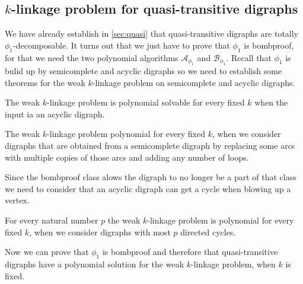 \subsection{$k$-linkage problem for quasi-transitive digraphs}
We have already establish in \autoref{sec:quasi} that quasi-transitive digraphs are totally $\phi_1$-decomposable.
It turns out that we just have to prove that $\phi_1$ is bombproof, for that we need the two polynomial algorithms $\mathcal{A}_{\phi_1}$ and $\mathcal{B}_{\phi_1}$. Recall that $\phi_1$ is bulid up by semicomplete and acyclic digraphs so we need to establish some theorems for the weak $k$-linkage problem on semicomplete and acyclic digraphs.
\begin{thm}
    The weak $k$-linkage problem is polynomial solvable for every fixed $k$ when the input ia an acyclic digraph.
\end{thm}
\begin{thm}
    The weak $k$-linkage problem polynomial for every fixed $k$, when we consider digraphs that are obtained from a semicomplete digraph by replacing some arcs with multiple copies of those arcs and adding any number of loops.
\end{thm}

Since the bombproof class alows the digraph to no longer be a part of that class we need to consider that an acyclic digraph can get a cycle when blowing up a vertex. 
\begin{thm}
    For every natural number $p$ the weak $k$-linkage problem is polynomial for every fixed $k$, when we consider digraphs with most $p$ directed cycles.
\end{thm}

Now we can prove that $\phi_1$ is bombproof and therefore that quasi-transitive digraphs have a polynomial solution for the weak $k$-linkage problem, when $k$ is fixed.

